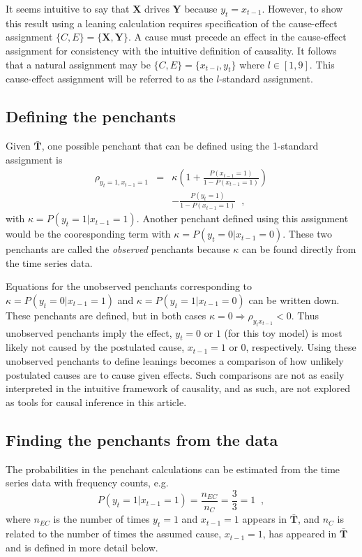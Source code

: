 \documentclass[a4paper,11pt,twocolumn]{article}
\begin{document}
It seems intuitive to say that $\mathbf{X}$ drives $\mathbf{Y}$ because $y_t=x_{t-1}$.  However, to show this result using a leaning calculation requires specification of the cause-effect assignment $\{C,E\}=\{\mathbf{X},\mathbf{Y}\}$.  A cause must precede an effect in the cause-effect assignment for consistency with the intuitive definition of causality.  It follows that a natural assignment may be $\{C,E\}=\{x_{t-l},y_t\}$ where $l\in[1,9]$.  This cause-effect assignment will be referred to as the $l$-standard assignment.

\subsection{Defining the penchants}
Given $\bar{\mathbf{T}}$, one possible penchant that can be defined using the 1-standard assignment is
\begin{eqnarray*}
\rho_{y_{t}=1,x_{t-1}=1} &=& \kappa \left(1+\frac{P\left(x_{t-1} = 1\right)}{1-P\left(x_{t-1} = 1\right)}\right)\\
& & -\frac{P\left(y_{t} = 1\right)}{1-P\left(x_{t-1} = 1\right)}\;\;,
\end{eqnarray*}
with $\kappa = P\left( y_t = 1 | x_{t-1} = 1\right)$.  Another penchant defined using this assignment would be the cooresponding term with $\kappa = P\left( y_t = 0 | x_{t-1} = 0\right)$.  These two penchants are called the {\em observed} penchants because $\kappa$ can be found directly from the time series data.  

Equations for the unobserved penchants corresponding to $\kappa = P\left( y_t = 0 | x_{t-1} = 1\right)$ and $\kappa = P\left( y_t = 1 | x_{t-1} = 0\right)$ can be written down.  These penchants are defined, but in both cases $\kappa=0\Rightarrow \rho_{y_{t}x_{t-1}} < 0$.  Thus unobserved penchants imply the effect, $y_t = 0$ or $1$ (for this toy model) is most likely not caused by the postulated cause, $x_{t-1} = 1$ or $0$, respectively.  Using these unobserved penchants to define leanings becomes a comparison of how unlikely postulated causes are to cause given effects.  Such comparisons are not as easily interpreted in the intuitive framework of causality, and as such, are not explored as tools for causal inference in this article. 

\subsection{Finding the penchants from the data}
The probabilities in the penchant calculations can be estimated from the time series data with frequency counts, e.g.\
$$
P\left( y_t = 1 | x_{t-1} = 1\right) = \frac{n_{EC}}{n_C} = \frac{3}{3} = 1\;\;,
$$
where $n_{EC}$ is the number of times $y_t=1$ and $x_{t-1}=1$ appears in $\bar{\mathbf{T}}$, and $n_{C}$ is related to the number of times the assumed cause, $x_{t-1}=1$, has appeared in $\bar{\mathbf{T}}$ and is defined in more detail below.      
\end{document}
